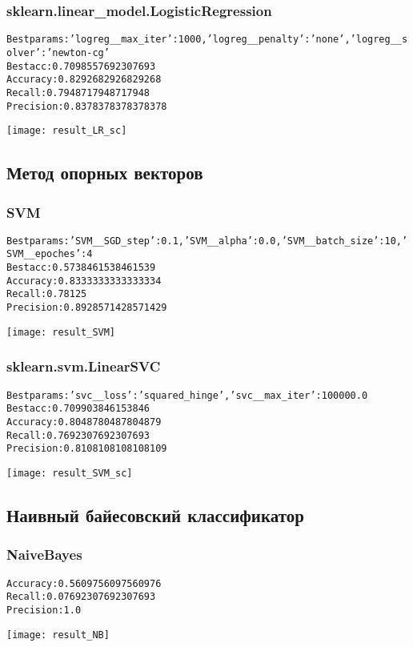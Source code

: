 \subsubsection{sklearn.linear\_model.LogisticRegression}
\begin{alltt}
Best params: {'logreg__max_iter': 1000, 'logreg__penalty': 'none', 'logreg__solver': 'newton-cg'}
Best acc: 0.7098557692307693
Accuracy: 0.8292682926829268
Recall: 0.7948717948717948
Precision: 0.8378378378378378
\end{alltt}
\begin{center}
\texttt{[image: result\_LR\_sc]}
\end{center}
\pagebreak

\subsection{Метод опорных векторов}
\subsubsection{SVM}
\begin{alltt}
Best params: {'SVM__SGD_step': 0.1, 'SVM__alpha': 0.0, 'SVM__batch_size': 10, 'SVM__epoches': 4}
Best acc: 0.5738461538461539
Accuracy: 0.8333333333333334
Recall: 0.78125
Precision: 0.8928571428571429
\end{alltt}
\begin{center}
\texttt{[image: result\_SVM]}
\end{center}

\subsubsection{sklearn.svm.LinearSVC}
\begin{alltt}
Best params: {'svc__loss': 'squared_hinge', 'svc__max_iter': 100000.0}
Best acc: 0.709903846153846
Accuracy: 0.8048780487804879
Recall: 0.7692307692307693
Precision: 0.8108108108108109
\end{alltt}
\begin{center}
\texttt{[image: result\_SVM\_sc]}
\end{center}
\pagebreak

\subsection{Наивный байесовский классификатор}
\subsubsection{NaiveBayes}
\begin{alltt}
Accuracy: 0.5609756097560976
Recall: 0.07692307692307693
Precision: 1.0
\end{alltt}
\begin{center}
\texttt{[image: result\_NB]}
\end{center}

